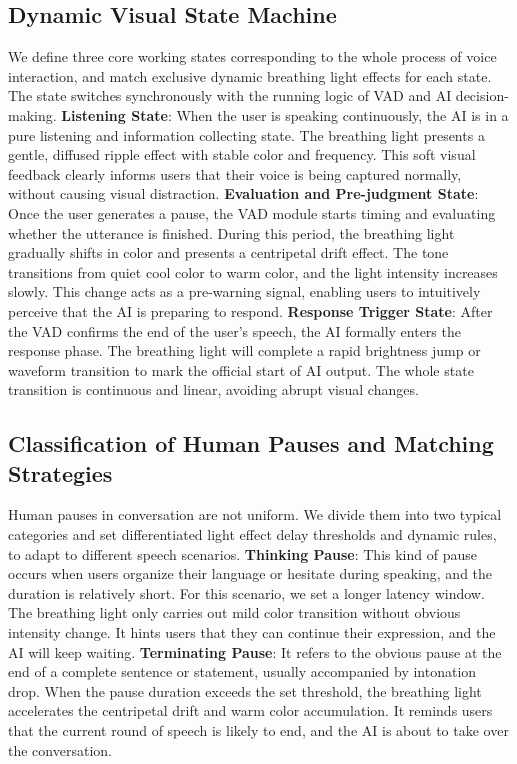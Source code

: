 \documentclass{article}
\begin{document}
\subsection{Dynamic Visual State Machine}
We define three core working states corresponding to the whole process of voice interaction,
and match exclusive dynamic breathing light effects for each state. The state switches
synchronously with the running logic of VAD and AI decision-making.
\textbf{Listening State}: When the user is speaking continuously, the AI is in a pure listening
and information collecting state. The breathing light presents a gentle, diffused ripple effect
with stable color and frequency. This soft visual feedback clearly informs users that their
voice is being captured normally, without causing visual distraction.
\textbf{Evaluation and Pre-judgment State}: Once the user generates a pause, the VAD
module starts timing and evaluating whether the utterance is finished. During this period, the
breathing light gradually shifts in color and presents a centripetal drift effect. The tone
transitions from quiet cool color to warm color, and the light intensity increases slowly. This
change acts as a pre-warning signal, enabling users to intuitively perceive that the AI is
preparing to respond.
\textbf{Response Trigger State}: After the VAD confirms the end of the user’s speech, the AI
formally enters the response phase. The breathing light will complete a rapid brightness
jump or waveform transition to mark the official start of AI output. The whole state transition
is continuous and linear, avoiding abrupt visual changes.
\subsection{Classification of Human Pauses and Matching Strategies}
Human pauses in conversation are not uniform. We divide them into two typical categories
and set differentiated light effect delay thresholds and dynamic rules, to adapt to different
speech scenarios.
\textbf{Thinking Pause}: This kind of pause occurs when users organize their language or
hesitate during speaking, and the duration is relatively short. For this scenario, we set a
longer latency window. The breathing light only carries out mild color transition without
obvious intensity change. It hints users that they can continue their expression, and the AI
will keep waiting.
\textbf{Terminating Pause}: It refers to the obvious pause at the end of a complete sentence
or statement, usually accompanied by intonation drop. When the pause duration exceeds
the set threshold, the breathing light accelerates the centripetal drift and warm color
accumulation. It reminds users that the current round of speech is likely to end, and the AI is
about to take over the conversation.
\end{document}
